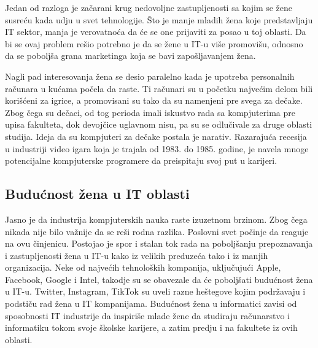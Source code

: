 \documentclass[a4paper,12pt]{article}
\begin{document}
Jedan od razloga je začarani krug nedovoljne zastupljenosti sa kojim se žene susreću kada udju u svet tehnologije. 
Što je manje mladih žena koje predstavljaju IT sektor, manja je verovatnoća da će se one prijaviti za posao u toj oblasti. 
Da bi se ovaj problem rešio potrebno je da se žene u IT-u više promovišu, 
odnosno da se poboljša grana marketinga koja se bavi zapošljavanjem žena.


Nagli pad interesovanja žena se desio paralelno kada je upotreba personalnih računara u kućama počela da raste. 
Ti računari su u početku najvećim delom bili korišćeni za igrice, a promovisani su tako da su namenjeni pre svega za dečake. 
Zbog čega su dečaci, od tog perioda imali iskustvo rada sa kompjuterima pre upisa fakulteta, dok devojčice uglavnom nisu, 
pa su se odlučivale za druge oblasti studija. Ideja da su kompjuteri za dečake postala je narativ. 
Razarajuća recesija u industriji video igara koja je trajala od 1983. do 1985. godine, je navela mnoge potencijalne 
kompjuterske programere da preispitaju svoj put u karijeri. 


\subsection{Budućnost žena u IT oblasti}
Jasno je da industrija kompjuterskih nauka raste izuzetnom brzinom. Zbog čega nikada nije bilo važnije da se reši rodna razlika.
Poslovni svet počinje da reaguje na ovu činjenicu. Postojao je spor i stalan tok rada na poboljšanju prepoznavanja i zastupljenosti
žena u IT-u kako iz velikih preduzeća tako i iz manjih organizacija. Neke od najvećih tehnoloških kompanija, uključujući Apple, 
Facebook, Google i Intel, takodje su se obavezale da će poboljšati budućnost žena u IT-u. Twitter, Instagram, TikTok su uveli razne 
heštegove kojim podržavaju i podstiču rad žena u IT kompanijama. Budućnost žena u informatici zavisi od sposobnosti IT industrije 
da inspiriše mlade žene da studiraju računarstvo i informatiku tokom svoje školske karijere, a zatim predju i na fakultete iz ovih oblasti.

\newpage



\cite{ashcraft2016women}
\cite{branson2018future}
\end{document}
